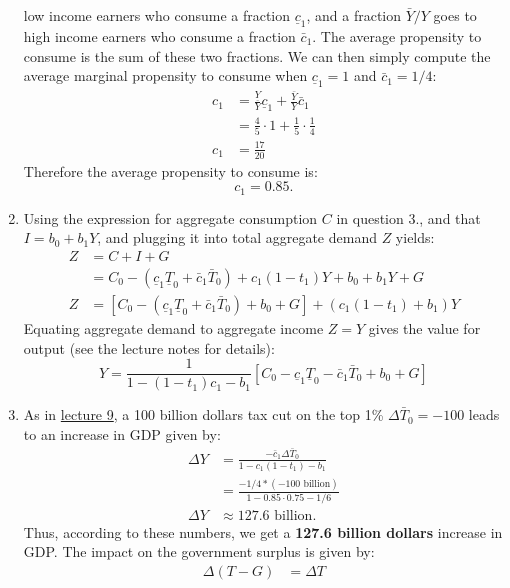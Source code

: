 \documentclass[]{book}
\theoremstyle{definition}
\theoremstyle{definition}
\theoremstyle{definition}
\theoremstyle{remark}
\begin{document}
\begin{enumerate}
  low income earners who consume a fraction \(\underline{c}_1\), and a
  fraction \(\bar{Y}/Y\) goes to high income earners who consume a
  fraction \(\bar{c}_1\). The average propensity to consume is the sum
  of these two fractions. We can then simply compute the average
  marginal propensity to consume when \(\underline{c}_1=1\) and
  \(\bar{c}_1=1/4\): \[
  \begin{aligned}
  c_1 &= \frac{\underline{Y}}{Y}\underline{c}_{1} + \frac{\bar{Y}}{Y}\bar{c}_{1}\\
  &=\frac{4}{5}\cdot 1 + \frac{1}{5}\cdot \frac{1}{4}\\
  c_1 &= \frac{17}{20}
  \end{aligned}
  \] Therefore the average propensity to consume is:
  \[\boxed{c_1 = 0.85}.\]
\item
  Using the expression for aggregate consumption \(C\) in question 3.,
  and that \(I=b_0+b_1 Y\), and plugging it into total aggregate demand
  \(Z\) yields: \[
  \begin{aligned}
  Z   &=C+I+G\\
  &=C_0 -\left(\underline{c}_{1}\underline{T}_0+\bar{c}_{1}\bar{T}_0\right)+c_1 (1-t_1) Y + b_{0}+b_{1}Y+G\\
  Z   &=\left[C_0 -\left(\underline{c}_{1}\underline{T}_0+\bar{c}_{1}\bar{T}_0\right)+ b_{0} + G \right]+ \left(c_1(1-t_1) + b_1\right) Y 
  \end{aligned}
  \] Equating aggregate demand to aggregate income \(Z = Y\) gives the
  value for output (see the lecture notes for details):
  \[\boxed{Y=\frac{1}{1-\left(1-t_{1}\right)c_{1}-b_{1}}\left[C_0-\underline{c}_{1}\underline{T}_{0}-\bar{c}_{1}\bar{T}_{0}+b_{0}+G\right]}\]
\item
  As in \protect\hyperlink{redistributive}{lecture 9}, a 100 billion
  dollars tax cut on the top 1\% \(\Delta \bar{T}_0 = -100\) leads to an
  increase in GDP given by: \[
  \begin{aligned}
  \Delta Y &=\frac{-\bar{c}_1 \Delta \bar{T}_0}{1-c_1(1-t_1)-b_1}\\
  &=\frac{-1/4 * (-100 \text{ billion})}{1-0.85 \cdot 0.75-1/6}\\
  \Delta Y&\approx 127.6 \text{ billion}.
  \end{aligned}
  \] Thus, according to these numbers, we get a \textbf{127.6 billion
  dollars} increase in GDP. The impact on the government surplus is
  given by: \[
  \begin{aligned}
  \Delta\left(T-G\right)&=\Delta T\\

\end{aligned}\]
\end{enumerate}
\end{document}
